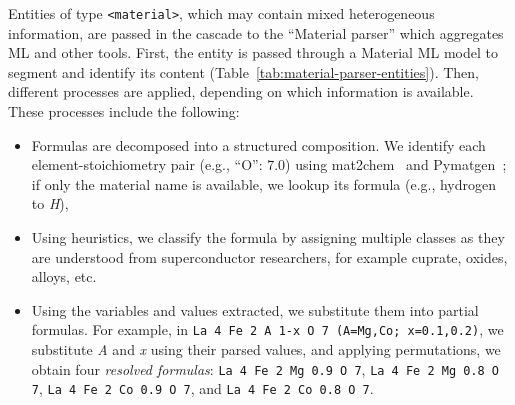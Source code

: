 \documentclass[]{interact}
\theoremstyle{plain}%
\theoremstyle{definition}
\theoremstyle{remark}
\begin{document}
Entities of type \texttt{<material>}, which may contain mixed heterogeneous information, are passed in the cascade to the ``Material parser'' which aggregates ML and other tools.
First, the entity is passed through a Material ML model to segment and identify its content (Table~\ref{tab:material-parser-entities}).
Then, different processes are applied, depending on which information is available. 
These processes include the following:
\begin{itemize}
    \item Formulas are decomposed into a structured composition. We identify each element-stoichiometry pair (e.g., ``O'': 7.0) using mat2chem~\cite{kononova_text-mined_2019} and Pymatgen~\cite{Ong2013}; if only the material name is available, we lookup its formula (e.g., hydrogen to \textit{H}),
    \item Using heuristics, we classify the formula by assigning multiple classes as they are understood from superconductor researchers, for example cuprate, oxides, alloys, etc.
    \item Using the variables and values extracted, we substitute them into partial formulas. For example, in \texttt{La 4 Fe 2 A 1-x O 7 (A=Mg,Co; x=0.1,0.2)}, we substitute \textit{A} and \textit{x} using their parsed values, and applying permutations, we obtain four \textit{resolved formulas}: \texttt{La 4 Fe 2 Mg 0.9 O 7}, \texttt{La 4 Fe 2 Mg 0.8 O 7}, \texttt{La 4 Fe 2 Co 0.9 O 7}, and \texttt{La 4 Fe 2 Co 0.8 O 7}.
\end{itemize}
\end{document}
